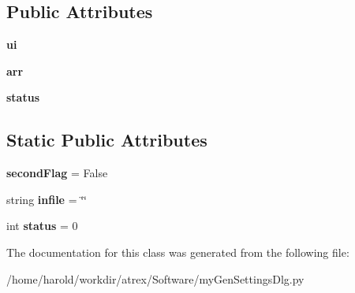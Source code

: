 \subsection*{Public Attributes}
\begin{DoxyCompactItemize}
\item 
\hypertarget{classmyGenSettingsDlg_1_1myGenSettingsDlg_a7273bd37d323cb99b1babfe474fb0794}{{\bfseries ui}}\label{classmyGenSettingsDlg_1_1myGenSettingsDlg_a7273bd37d323cb99b1babfe474fb0794}

\item 
\hypertarget{classmyGenSettingsDlg_1_1myGenSettingsDlg_abb00b15bb0a18384e61e828dd8df30b7}{{\bfseries arr}}\label{classmyGenSettingsDlg_1_1myGenSettingsDlg_abb00b15bb0a18384e61e828dd8df30b7}

\item 
\hypertarget{classmyGenSettingsDlg_1_1myGenSettingsDlg_a0a6c727a9bd3bc9a5eccb189f58e0a6a}{{\bfseries status}}\label{classmyGenSettingsDlg_1_1myGenSettingsDlg_a0a6c727a9bd3bc9a5eccb189f58e0a6a}

\end{DoxyCompactItemize}
\subsection*{Static Public Attributes}
\begin{DoxyCompactItemize}
\item 
\hypertarget{classmyGenSettingsDlg_1_1myGenSettingsDlg_af1f09c584de47bbe2a149f514d48bc9c}{{\bfseries second\-Flag} = False}\label{classmyGenSettingsDlg_1_1myGenSettingsDlg_af1f09c584de47bbe2a149f514d48bc9c}

\item 
\hypertarget{classmyGenSettingsDlg_1_1myGenSettingsDlg_ac6e0f33c3d90c70cfb468c892557316a}{string {\bfseries infile} = \char`\"{}\char`\"{}}\label{classmyGenSettingsDlg_1_1myGenSettingsDlg_ac6e0f33c3d90c70cfb468c892557316a}

\item 
\hypertarget{classmyGenSettingsDlg_1_1myGenSettingsDlg_a9f34f21544d7598a99027a2d828e2c36}{int {\bfseries status} = 0}\label{classmyGenSettingsDlg_1_1myGenSettingsDlg_a9f34f21544d7598a99027a2d828e2c36}

\end{DoxyCompactItemize}


The documentation for this class was generated from the following file\-:\begin{DoxyCompactItemize}
\item 
/home/harold/workdir/atrex/\-Software/my\-Gen\-Settings\-Dlg.\-py\end{DoxyCompactItemize}
